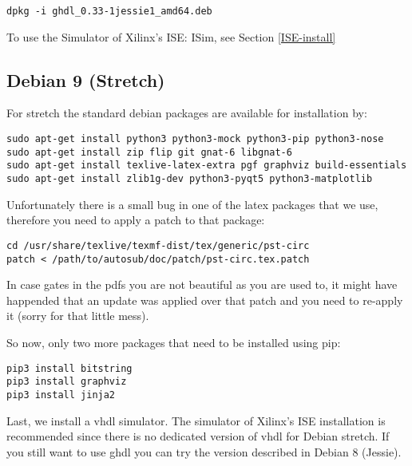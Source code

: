 \begin{verbatim}
dpkg -i ghdl_0.33-1jessie1_amd64.deb
\end{verbatim}

To use the Simulator of Xilinx's ISE: ISim, see Section \ref{ISE-install}


\subsection{Debian 9 (Stretch)}

For stretch the standard debian packages are available for installation by:

\begin{verbatim}
sudo apt-get install python3 python3-mock python3-pip python3-nose
sudo apt-get install zip flip git gnat-6 libgnat-6
sudo apt-get install texlive-latex-extra pgf graphviz build-essentials
sudo apt-get install zlib1g-dev python3-pyqt5 python3-matplotlib 
\end{verbatim}

Unfortunately there is a small bug in one of the latex packages that we use,
therefore you need to apply a patch to that package:

\begin{verbatim}
cd /usr/share/texlive/texmf-dist/tex/generic/pst-circ
patch < /path/to/autosub/doc/patch/pst-circ.tex.patch
\end{verbatim}

In case gates in the pdfs you are not beautiful as you are used to, it might have
happended that an update was applied over that patch and you need to re-apply it (sorry for that little mess).

So now, only two more packages that need to be installed using pip:

\begin{verbatim}
pip3 install bitstring
pip3 install graphviz
pip3 install jinja2
\end{verbatim}

Last, we install a vhdl simulator. The simulator of Xilinx's ISE installation is recommended since there is no dedicated
version of vhdl for Debian stretch. 
If you still want to use ghdl you can try the version described in Debian 8 (Jessie).

